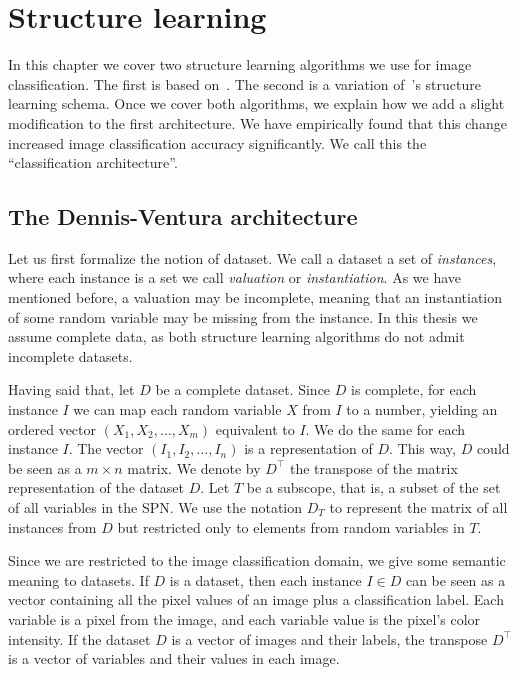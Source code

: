 \chapter{Structure learning}\label{chp:structure}

In this chapter we cover two structure learning algorithms we use for image classification. The
first is based on~\cite{clustering}. The second is a variation of~\cite{gens-domingos}'s structure
learning schema. Once we cover both algorithms, we explain how we add a slight modification to the
first architecture. We have empirically found that this change increased image classification
accuracy significantly. We call this the ``classification architecture''.

\section{The Dennis-Ventura architecture}

Let us first formalize the notion of dataset. We call a dataset a set of \textit{instances}, where
each instance is a set we call \textit{valuation} or \textit{instantiation}. As we have mentioned
before, a valuation may be incomplete, meaning that an instantiation of some random variable may be
missing from the instance. In this thesis we assume complete data, as both structure learning
algorithms do not admit incomplete datasets.

Having said that, let $D$ be a complete dataset. Since $D$ is complete, for each instance $I$ we
can map each random variable $X$ from $I$ to a number, yielding an ordered vector $(X_1,X_2,\ldots,
X_m)$ equivalent to $I$. We do the same for each instance $I$. The vector $(I_1,I_2,\ldots, I_n)$
is a representation of $D$. This way, $D$ could be seen as a $m\times n$ matrix. We denote by
$D^\intercal$ the transpose of the matrix representation of the dataset $D$.  Let $T$ be a
subscope, that is, a subset of the set of all variables in the SPN\@. We use the notation $D_T$ to
represent the matrix of all instances from $D$ but restricted only to elements from random
variables in $T$.

Since we are restricted to the image classification domain, we give some semantic meaning to
datasets. If $D$ is a dataset, then each instance $I\in D$ can be seen as a vector containing all
the pixel values of an image plus a classification label. Each variable is a pixel from the image,
and each variable value is the pixel's color intensity. If the dataset $D$ is a vector of images
and their labels, the transpose $D^\intercal$ is a vector of variables and their values in each
image.

